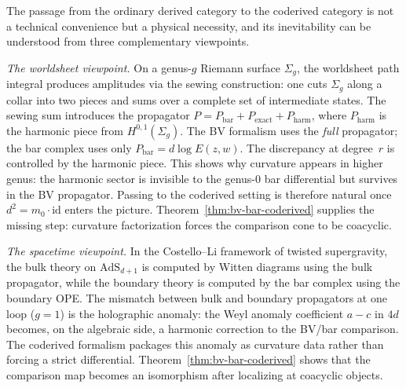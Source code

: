 \begin{remark}
\label{rem:bv-bar-coderived-why}
The passage from the ordinary derived category to the coderived
category is not a technical convenience but a physical necessity,
and its inevitability can be understood from three complementary
viewpoints.

\emph{The worldsheet viewpoint.}
On a genus-$g$ Riemann surface $\Sigma_g$, the worldsheet path
integral produces amplitudes via the sewing construction: one cuts
$\Sigma_g$ along a collar into two pieces and sums over a complete
set of intermediate states. The sewing sum introduces the
propagator $P = P_{\mathrm{bar}} + P_{\mathrm{exact}} +
P_{\mathrm{harm}}$, where $P_{\mathrm{harm}}$ is the harmonic
piece from $H^{0,1}(\Sigma_g)$. The BV formalism uses the
\emph{full} propagator; the bar complex uses only
$P_{\mathrm{bar}} = d\log E(z,w)$. The discrepancy at degree~$r$
is controlled by the harmonic piece. This shows why curvature
appears in higher genus: the harmonic sector is invisible to the
genus-$0$ bar differential but survives in the BV propagator.
Passing to the coderived setting is therefore natural once
$d^2 = m_0 \cdot \mathrm{id}$ enters the picture. Theorem~\ref{thm:bv-bar-coderived}
supplies the missing step: curvature factorization forces the
comparison cone to be coacyclic.

\emph{The spacetime viewpoint.}
In the Costello--Li framework of twisted supergravity, the bulk
theory on $\mathrm{AdS}_{d+1}$ is computed by Witten diagrams
using the bulk propagator, while the boundary theory is computed
by the bar complex using the boundary OPE. The mismatch between
bulk and boundary propagators at one loop ($g = 1$) is the
holographic anomaly: the Weyl anomaly coefficient
$a - c$ in $4d$ becomes, on the algebraic side, a harmonic
correction to the BV/bar comparison. The coderived formalism
packages this anomaly as curvature data rather than forcing a
strict differential. Theorem~\ref{thm:bv-bar-coderived} shows that
the comparison map becomes an isomorphism after localizing at
coacyclic objects.


\end{remark}
